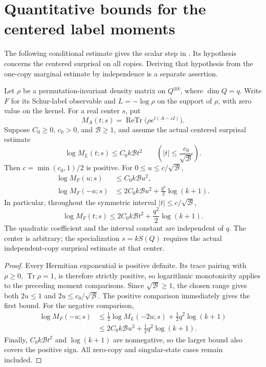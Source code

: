 \section{Quantitative bounds for the centered label moments}
\label{sec:schur-label-moment-bounds}

The following conditional estimate gives the scalar step in
\cite[Section~7, lines~227--238]{OpenAI2026AreaLaw}. Its hypothesis concerns
the centered surprisal on all copies. Deriving that hypothesis from the
one-copy marginal estimate by independence is a separate assertion.

\begin{theorem}
\label{thm:schur-label-moment-bounds}
\leanok
Let $\rho$ be a permutation-invariant density matrix on $Q^{\otimes k}$,
where $\dim Q=q$. Write $F$ for its Schur-label observable and $L=-\log\rho$
on the support of $\rho$, with zero value on the kernel. For a real center
$s$, put
\[
 M_A(t;s)=\operatorname{ReTr}\bigl(\rho e^{t(A-sI)}\bigr).
\]
Suppose $C_0\ge0$, $c_0>0$, and $\mathcal B\ge1$, and assume the actual
centered surprisal estimate
\[
 \log M_L(t;s)\le C_0k\mathcal B t^2
 \qquad\left(|t|\le\frac{c_0}{\sqrt{\mathcal B}}\right).
\]
Then $c=\min(c_0,1)/2$ is positive. For $0\le u\le c/\sqrt{\mathcal B}$,
\begin{align*}
 \log M_F(u;s)&\le C_0k\mathcal B u^2,\\
 \log M_F(-u;s)&\le 2C_0k\mathcal B u^2
                  +\frac{q^2}{2}\log(k+1).
\end{align*}
In particular, throughout the symmetric interval
$|t|\le c/\sqrt{\mathcal B}$,
\[
 \log M_F(t;s)\le 2C_0k\mathcal B t^2
                      +\frac{q^2}{2}\log(k+1).
\]
The quadratic coefficient and the interval constant are independent of $q$.
The center is arbitrary; the specialization $s=kS(Q)$ requires the actual
independent-copy surprisal estimate at that center.
\end{theorem}

\begin{proof}
\leanok
Every Hermitian exponential is positive definite. Its trace pairing with
$\rho\ge0$, $\operatorname{Tr}\rho=1$, is therefore strictly positive,
so logarithmic monotonicity applies to the preceding moment comparisons.
Since $\sqrt{\mathcal B}\ge1$, the chosen range gives both $2u\le1$ and
$2u\le c_0/\sqrt{\mathcal B}$. The positive comparison immediately gives
the first bound. For the negative comparison,
\begin{align*}
 \log M_F(-u;s)
 &\le \tfrac12\log M_L(-2u;s)+\tfrac12 q^2\log(k+1)\\
 &\le 2C_0k\mathcal B u^2+\tfrac12 q^2\log(k+1).
\end{align*}
Finally, $C_0k\mathcal B t^2$ and $\log(k+1)$ are nonnegative, so the
larger bound also covers the positive sign. All zero-copy and singular-state
cases remain included.
\end{proof}
